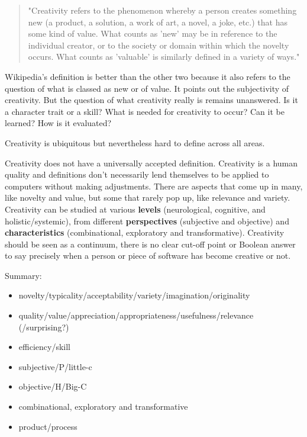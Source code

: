 \begin{quote}
  "Creativity refers to the phenomenon whereby a person creates something new (a product, a solution, a work of art, a novel, a joke, etc.) that has some kind of value. What counts as 'new' may be in reference to the individual creator, or to the society or domain within which the novelty occurs. What counts as 'valuable' is similarly defined in a variety of ways."
\end{quote}

Wikipedia's definition is better than the other two because it also refers to the question of what is classed as new or of value. It points out the subjectivity of creativity. But the question of what creativity really is remains unanswered. Is it a character trait or a skill? What is needed for creativity to occur? Can it be learned? How is it evaluated?

Creativity is ubiquitous but nevertheless hard to define across all areas.

Creativity does not have a universally accepted definition. Creativity is a human quality and definitions don’t necessarily lend themselves to be applied to computers without making adjustments. There are aspects that come up in many, like novelty and value, but some that rarely pop up, like relevance and variety. Creativity can be studied at various \textbf{levels} (neurological, cognitive, and holistic/systemic), from different \textbf{perspectives} (subjective and objective) and \textbf{characteristics} (combinational, exploratory and transformative). Creativity should be seen as a continuum, there is no clear cut-off point or Boolean answer to say precisely when a person or piece of software has become creative or not.

Summary:
\begin{shaded}
  \begin{itemize}
    \item novelty/typicality/acceptability/variety/imagination/originality
    \item quality/value/appreciation/appropriateness/usefulness/relevance (/surprising?)
    \item efficiency/skill
    \item subjective/P/little-c
    \item objective/H/Big-C
    \item combinational, exploratory and transformative
    \item product/process
  \end{itemize}
\end{shaded}\citep{Berners-Lee1998, Everitt2013, Everitt2012}

